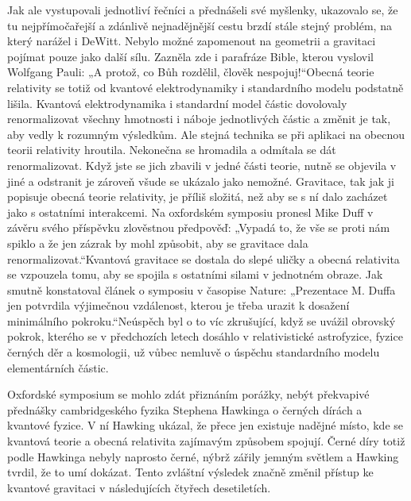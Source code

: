   Jak ale vystupovali jednotliví řečníci a přednášeli své myšlenky, ukazovalo se, že tu
  nejpřímočařejší a zdánlivě nejnadějnější cestu brzdí stále stejný problém, na který narážel i
  DeWitt. Nebylo možné zapomenout na geometrii a gravitaci pojímat pouze jako další sílu. Zazněla
  zde i parafráze Bible, kterou vyslovil Wolfgang Pauli: „A protož, co Bůh rozdělil, člověk
  nespojuj!“Obecná teorie relativity se totiž od kvantové elektrodynamiky i standardního modelu
  podstatně lišila. Kvantová elektrodynamika i standardní model částic dovolovaly renormalizovat
  všechny hmotnosti i náboje jednotlivých částic a změnit je tak, aby vedly k rozumným výsledkům.
  Ale stejná technika se při aplikaci na obecnou teorii relativity hroutila. Nekonečna se hromadila
  a odmítala se dát renormalizovat. Když jste se jich zbavili v jedné části teorie, nutně se
  objevila v jiné a odstranit je zároveň všude se ukázalo jako nemožné. Gravitace, tak jak ji
  popisuje obecná teorie relativity, je příliš složitá, než aby se s ní dalo zacházet jako s
  ostatními interakcemi. Na oxfordském symposiu pronesl Mike Duff v závěru svého příspěvku
  zlověstnou předpověď: „Vypadá to, že vše se proti nám spiklo a že jen zázrak by mohl způsobit, aby
  se gravitace dala renormalizovat.“Kvantová gravitace se dostala do slepé uličky a obecná
  relativita se vzpouzela tomu, aby se spojila s ostatními silami v jednotném obraze. Jak smutně
  konstatoval článek o symposiu v časopise Nature: „Prezentace M. Duffa jen potvrdila výjimečnou
  vzdálenost, kterou je třeba urazit k dosažení minimálního pokroku.“Neúspěch byl o to víc
  zkrušující, když se uvážil obrovský pokrok, kterého se v předchozích letech dosáhlo v
  relativistické astrofyzice, fyzice černých děr a kosmologii, už vůbec nemluvě o úspěchu
  standardního modelu elementárních částic. 
  
  Oxfordské symposium se mohlo zdát přiznáním porážky, nebýt překvapivé přednášky cambridgeského
  fyzika Stephena Hawkinga o černých dírách a kvantové fyzice. V ní Hawking ukázal, že přece jen
  existuje nadějné místo, kde se kvantová teorie a obecná relativita zajímavým způsobem spojují.
  Černé díry totiž podle Hawkinga nebyly naprosto černé, nýbrž zářily jemným světlem a Hawking
  tvrdil, že to umí dokázat. Tento zvláštní výsledek značně změnil přístup ke kvantové gravitaci v
  následujících čtyřech desetiletích. 
  
